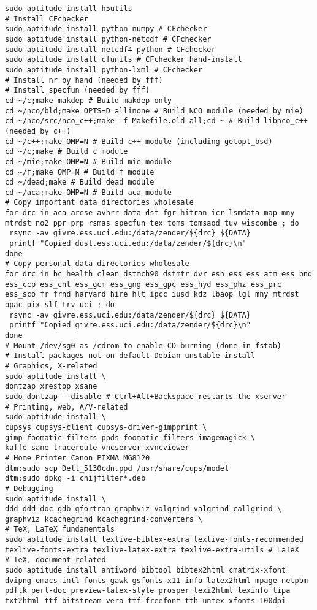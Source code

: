 \documentclass[12pt,twoside]{article}
\begin{document}
\begin{verbatim}
sudo aptitude install h5utils
# Install CFchecker
sudo aptitude install python-numpy # CFchecker
sudo aptitude install python-netcdf # CFchecker
sudo aptitude install netcdf4-python # CFchecker
sudo aptitude install cfunits # CFchecker hand-install
sudo aptitude install python-lxml # CFchecker
# Install nr by hand (needed by fff)
# Install specfun (needed by fff)
cd ~/c;make makdep # Build makdep only
cd ~/nco/bld;make OPTS=D allinone # Build NCO module (needed by mie)
cd ~/nco/src/nco_c++;make -f Makefile.old all;cd ~ # Build libnco_c++ (needed by c++)
cd ~/c++;make OMP=N # Build c++ module (including getopt_bsd)
cd ~/c;make # Build c module
cd ~/mie;make OMP=N # Build mie module
cd ~/f;make OMP=N # Build f module
cd ~/dead;make # Build dead module
cd ~/aca;make OMP=N # Build aca module
# Copy important data directories wholesale
for drc in aca arese avhrr data dst fgr hitran icr lsmdata map mny mtrdst no2 ppr prp rsmas specfun tex toms tomsaod tuv wiscombe ; do
 rsync -av givre.ess.uci.edu:/data/zender/${drc} ${DATA}
 printf "Copied dust.ess.uci.edu:/data/zender/${drc}\n"
done
# Copy personal data directories wholesale
for drc in bc_health clean dstmch90 dstmtr dvr esh ess ess_atm ess_bnd ess_ccp ess_cnt ess_gcm ess_gng ess_gpc ess_hyd ess_phz ess_prc ess_sco fr frnd harvard hire hlt ipcc iusd kdz lbaop lgl mny mtrdst opac pix slf trv uci ; do
 rsync -av givre.ess.uci.edu:/data/zender/${drc} ${DATA}
 printf "Copied givre.ess.uci.edu:/data/zender/${drc}\n"
done
# Mount /dev/sg0 as /cdrom to enable CD-burning (done in fstab)
# Install packages not on default Debian unstable install 
# Graphics, X-related
sudo aptitude install \
dontzap xrestop xsane
sudo dontzap --disable # Ctrl+Alt+Backspace restarts the xserver
# Printing, web, A/V-related
sudo aptitude install \
cupsys cupsys-client cupsys-driver-gimpprint \
gimp foomatic-filters-ppds foomatic-filters imagemagick \
kaffe sane traceroute vncserver xvncviewer
# Home Printer Canon PIXMA MG8120
dtm;sudo scp Dell_5130cdn.ppd /usr/share/cups/model
dtm;sudo dpkg -i cnijfilter*.deb
# Debugging
sudo aptitude install \
ddd ddd-doc gdb gfortran graphviz valgrind valgrind-callgrind \
graphviz kcachegrind kcachegrind-converters \
# TeX, LaTeX fundamentals
sudo aptitude install texlive-bibtex-extra texlive-fonts-recommended texlive-fonts-extra texlive-latex-extra texlive-extra-utils # LaTeX
# TeX, document-related
sudo aptitude install antiword bibtool bibtex2html cmatrix-xfont dvipng emacs-intl-fonts gawk gsfonts-x11 info latex2html mpage netpbm pdftk perl-doc preview-latex-style prosper texi2html texinfo tipa txt2html ttf-bitstream-vera ttf-freefont tth untex xfonts-100dpi 

\end{verbatim}
\end{document}
